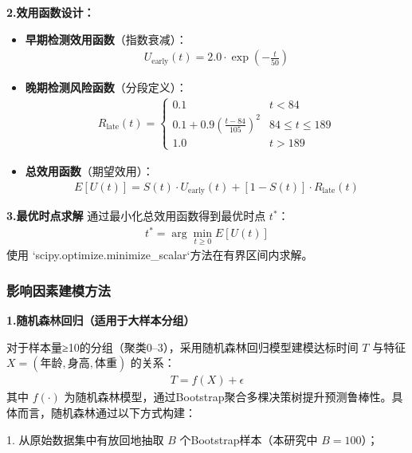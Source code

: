 \documentclass{article}
\begin{document}
\textbf{2.效用函数设计：}
\begin{itemize}
    \item \textbf{早期检测效用函数}（指数衰减）：
          \begin{gather}
              U_{\text{early}}(t) = 2.0 \cdot \exp\left(-\frac{t}{50}\right) \tag{12}
          \end{gather}
    \item \textbf{晚期检测风险函数}（分段定义）：
          \begin{gather}
              R_{\text{late}}(t) =
              \begin{cases}
                  0.1                                         & t < 84             \\
                  0.1 + 0.9 \left(\frac{t - 84}{105}\right)^2 & 84 \leq t \leq 189 \\
                  1.0                                         & t > 189
              \end{cases} \tag{13}
          \end{gather}
    \item \textbf{总效用函数}（期望效用）：
          \begin{gather}
              E[U(t)] = S(t) \cdot U_{\text{early}}(t) + [1 - S(t)] \cdot R_{\text{late}}(t) \tag{14}
          \end{gather}
\end{itemize}

\textbf{3.最优时点求解}
通过最小化总效用函数得到最优时点 $ t^* $：
\begin{gather}
    t^* = \arg\min_{t \geq 0} E[U(t)] \tag{15}
\end{gather}
使用 `scipy.optimize.minimize\_scalar`方法在有界区间内求解。
\subsubsection{\textbf{影响因素建模方法}}
\textbf{1.随机森林回归（适用于大样本分组）}

对于样本量≥10的分组（聚类0–3），采用随机森林回归模型建模达标时间 $ T $ 与特征 $ X = (\text{年龄},
    \text{身高}, \text{体重}) $ 的关系：
\begin{gather}
    T = f(X) + \epsilon \tag{16}
\end{gather}
其中 $ f(\cdot) $ 为随机森林模型，通过Bootstrap聚合多棵决策树提升预测鲁棒性。具体而言，随机森林通过以下方式构建：

1. 从原始数据集中有放回地抽取 $ B $ 个Bootstrap样本（本研究中 $ B = 100 $）；
\end{document}
